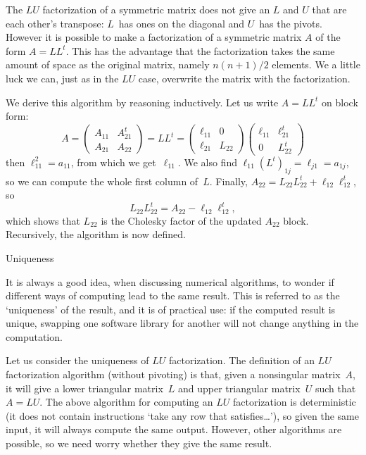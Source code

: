 The $LU$ factorization of a symmetric matrix does not give an $L$ and
$U$ that are each other's transpose: $L$~has ones on the diagonal  and
$U$~has the pivots. However it is possible to make a factorization of
a symmetric matrix $A$ of the form $A=LL^t$. This has the advantage
that the factorization takes the same amount of space as the original
matrix, namely $n(n+1)/2$ elements. We a little luck we can, just as
in the $LU$ case, overwrite the matrix with the factorization.

We derive this algorithm by reasoning inductively. Let us write $A=LL^t$
on block form:
\[ A=
\begin{pmatrix}
  A_{11}&A_{21}^t\\ A_{21}&A_{22}
\end{pmatrix} = LL^t = 
\begin{pmatrix}  \ell_{11}&0\\ \ell_{21} &L_{22} \end{pmatrix}
\begin{pmatrix}  \ell_{11}& \ell^t_{21} \\ 0&L^t_{22} \end{pmatrix}
\]
then $\ell_{11}^2=a_{11}$, from which we get~$\ell_{11}$. We also find
$\ell_{11}(L^t)_{1j}=\ell_{j1}=a_{1j}$, so we can compute the
whole first column of~$L$. Finally, $A_{22}=L_{22}L_{22}^t +
\ell_{12}\ell_{12}^t$, so 
\[ L_{22}L_{22}^t = A_{22} - \ell_{12}\ell_{12}^t, \]
which shows that $L_{22}$ is the Cholesky factor of the updated
$A_{22}$ block. Recursively, the algorithm is now defined.


 {Uniqueness}
\label{sec:LUunique}

It is always a good idea, when discussing numerical algorithms, to
wonder if different ways of computing lead to the same result. This is
referred to as the `uniqueness' of the result, and it is of practical
use: if the computed result is unique, swapping one software library
for another will not change anything in the computation.

Let us consider the uniqueness of $LU$ factorization. The definition
of an $LU$ factorization algorithm (without pivoting) is that, given a
nonsingular matrix~$A$, it will give a lower triangular matrix~$L$ and
upper triangular matrix~$U$ such that $A=LU$.  The above algorithm for
computing an $LU$ factorization is deterministic (it does not contain
instructions `take any row that satisfies\dots'), so given the same
input, it will always compute the same output. However, other
algorithms are possible, so we need worry whether they give the same result.

